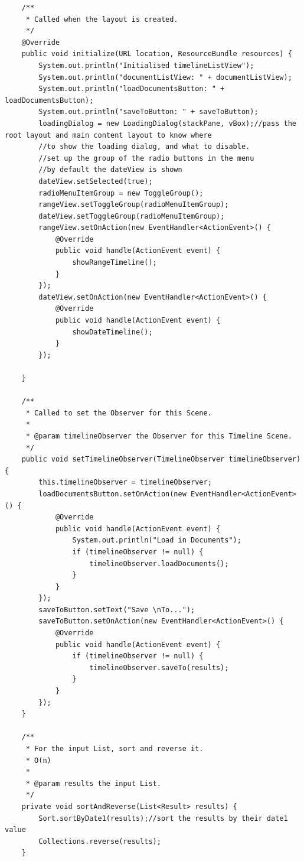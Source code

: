 \begin{lstlisting}
    /**
     * Called when the layout is created.
     */
    @Override
    public void initialize(URL location, ResourceBundle resources) {
        System.out.println("Initialised timelineListView");
        System.out.println("documentListView: " + documentListView);
        System.out.println("loadDocumentsButton: " + loadDocumentsButton);
        System.out.println("saveToButton: " + saveToButton);
        loadingDialog = new LoadingDialog(stackPane, vBox);//pass the root layout and main content layout to know where
        //to show the loading dialog, and what to disable.
        //set up the group of the radio buttons in the menu
        //by default the dateView is shown
        dateView.setSelected(true);
        radioMenuItemGroup = new ToggleGroup();
        rangeView.setToggleGroup(radioMenuItemGroup);
        dateView.setToggleGroup(radioMenuItemGroup);
        rangeView.setOnAction(new EventHandler<ActionEvent>() {
            @Override
            public void handle(ActionEvent event) {
                showRangeTimeline();
            }
        });
        dateView.setOnAction(new EventHandler<ActionEvent>() {
            @Override
            public void handle(ActionEvent event) {
                showDateTimeline();
            }
        });

    }

    /**
     * Called to set the Observer for this Scene.
     *
     * @param timelineObserver the Observer for this Timeline Scene.
     */
    public void setTimelineObserver(TimelineObserver timelineObserver) {
        this.timelineObserver = timelineObserver;
        loadDocumentsButton.setOnAction(new EventHandler<ActionEvent>() {
            @Override
            public void handle(ActionEvent event) {
                System.out.println("Load in Documents");
                if (timelineObserver != null) {
                    timelineObserver.loadDocuments();
                }
            }
        });
        saveToButton.setText("Save \nTo...");
        saveToButton.setOnAction(new EventHandler<ActionEvent>() {
            @Override
            public void handle(ActionEvent event) {
                if (timelineObserver != null) {
                    timelineObserver.saveTo(results);
                }
            }
        });
    }

    /**
     * For the input List, sort and reverse it.
     * O(n)
     *
     * @param results the input List.
     */
    private void sortAndReverse(List<Result> results) {
        Sort.sortByDate1(results);//sort the results by their date1 value
        Collections.reverse(results);
    }


\end{lstlisting}
